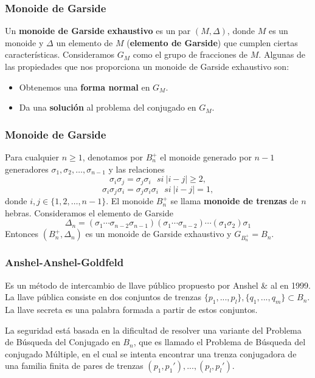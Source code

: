 \documentclass{beamer}
\begin{document}
\begin{frame}
\frametitle{Monoide de Garside}
Un \textbf{monoide de Garside exhaustivo} es un par $(M,\Delta)$, donde $M$ es un monoide y $\Delta$ un elemento de $M$ (\textbf{elemento de Garside}) que cumplen ciertas características. Consideramos $G_M$ como el grupo de fracciones de $M$. Algunas de las propiedades que nos proporciona un monoide de Garside exhaustivo son:
\begin{itemize}
\item Obtenemos una \textbf{forma normal} en $G_M$.
\item Da una \textbf{solución} al problema del conjugado en $G_M$.
\end{itemize}

\end{frame}

\begin{frame}
\frametitle{Monoide de Garside}
Para cualquier $n\geq 1$, denotamos por $B_n^+$ el monoide generado por $n-1$ generadores $\sigma_1,\sigma_2,\ldots,\sigma_{n-1}$ y las relaciones
$$\sigma_i\sigma_j=\sigma_j\sigma_i\ \ \ si\ |i-j|\geq 2,$$
$$\sigma_i\sigma_j\sigma_i=\sigma_j\sigma_i\sigma_i\ \ \ si\ |i-j|= 1,$$
donde $i,j\in\{1,2,\ldots,n-1\}$. El monoide $B_n^+$ se llama \textbf{monoide de trenzas} de $n$ hebras. Consideramos el elemento de Garside $$\Delta_n =(\sigma_1\cdots\sigma_{n-2}\sigma_{n-1})(\sigma_1\cdots\sigma_{n-2})\cdots(\sigma_1\sigma_2)\sigma_1$$
Entonces $(B_n^+,\Delta_n)$ es un monoide de Garside exhaustivo y $G_{B_n^+}=B_n$.
\end{frame}

\begin{frame}
\frametitle{Anshel-Anshel-Goldfeld}

Es un método de intercambio de llave público propuesto por Anshel \& al en 1999. 
La llave pública consiste en dos conjuntos de trenzas $\{p_1,...,p_l\},\{q_1,...,q_m\}\subset B_n$. La llave secreta es una palabra formada a partir de estos conjuntos.
\newline

La seguridad está basada en la dificultad de resolver una variante del Problema de Búsqueda del Conjugado en $B_n$, que es llamado el Problema de Búsqueda del conjugado Múltiple, en el cual se intenta encontrar una trenza conjugadora  de una familia finita de pares de trenzas $(p_1,p_1'),...,(p_l,p_l')$.

\end{frame}
\end{document}
